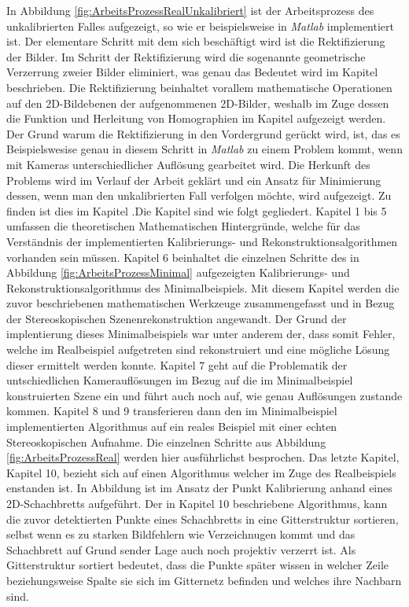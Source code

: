 In Abbildung \ref{fig:ArbeitsProzessRealUnkalibriert} ist der Arbeitsprozess des unkalibrierten Falles aufgezeigt, so wie er beispielsweise in \textit{Matlab} implementiert ist. Der elementare Schritt mit dem sich beschäftigt wird ist die Rektifizierung der Bilder. Im Schritt der Rektifizierung wird die sogenannte geometrische Verzerrung zweier Bilder eliminiert, was genau das Bedeutet wird im Kapitel  beschrieben. Die Rektifizierung beinhaltet vorallem mathematische Operationen auf den 2D-Bildebenen der aufgenommenen 2D-Bilder, weshalb im Zuge dessen die Funktion und Herleitung von Homographien im Kapitel  aufgezeigt werden. Der Grund warum die Rektifizierung in den Vordergrund gerückt wird, ist, das es Beispielswesise genau in diesem Schritt in \textit{Matlab} zu einem Problem kommt, wenn mit Kameras unterschiedlicher Auflösung gearbeitet wird. Die Herkunft des Problems wird im Verlauf der Arbeit geklärt und ein Ansatz für Minimierung dessen, wenn man den unkalibrierten Fall verfolgen möchte, wird aufgezeigt. Zu finden ist dies im Kapitel .Die Kapitel sind wie folgt gegliedert. Kapitel 1 bis 5 umfassen die theoretischen Mathematischen Hintergründe, welche für das Verständnis der implementierten Kalibrierungs- und Rekonstruktionsalgorithmen vorhanden sein müssen. Kapitel 6 beinhaltet die einzelnen Schritte des in Abbildung \ref{fig:ArbeitsProzessMinimal} aufgezeigten Kalibrierungs- und Rekonstruktionsalgorithmus des Minimalbeispiels. Mit diesem Kapitel werden die zuvor beschriebenen mathematischen Werkzeuge zusammengefasst und in Bezug der Stereoskopischen Szenenrekonstruktion angewandt. Der Grund der implentierung dieses Minimalbeispiels war unter anderem der, dass somit Fehler, welche im Realbeispiel aufgetreten sind rekonstruiert und eine mögliche Lösung dieser ermittelt werden konnte. Kapitel 7 geht auf die Problematik der untschiedlichen Kamerauflösungen im Bezug auf die im Minimalbeispiel konstruierten Szene ein und führt auch noch auf, wie genau Auflösungen zustande kommen. Kapitel 8 und 9 transferieren dann den im Minimalbeispiel implementierten Algorithmus auf ein reales Beispiel mit einer echten Stereoskopischen Aufnahme. Die einzelnen Schritte aus Abbildung \ref{fig:ArbeitsProzessReal} werden hier ausführlichst besprochen. Das letzte Kapitel, Kapitel 10, bezieht sich auf einen Algorithmus welcher im Zuge des Realbeispiels enstanden ist. In Abbildung  ist im Ansatz der Punkt Kalibrierung anhand eines 2D-Schachbretts aufgeführt. Der in Kapitel 10 beschriebene Algorithmus, kann die zuvor detektierten Punkte eines Schachbretts in eine Gitterstruktur sortieren, selbst wenn es zu starken Bildfehlern wie Verzeichnugen kommt und das Schachbrett auf Grund sender Lage auch noch projektiv verzerrt ist. Als Gitterstruktur sortiert bedeutet, dass die Punkte später wissen in welcher Zeile beziehungsweise Spalte sie sich im Gitternetz befinden und welches ihre Nachbarn sind. 

